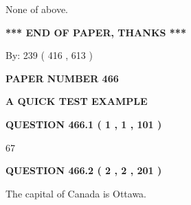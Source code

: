 \documentclass[12pt]{article}
\begin{document}
 
 None of above.
 
 
 
 
   
   
 \vspace{0.2in}
 
   
   
   
   
\vspace{1.0in} 
{\textbf{\large{ *** END OF PAPER, THANKS *** }}} 
   
   
\hspace{1.0in} By: 
 239 ( 416 ,  613 )
   
   
   
   
\newpage 
\setcounter{page}{ 
   466001 } 
   
   
   
   
 {\textbf{ \Large{ PAPER NUMBER  466  }}}
   
   
\vspace{0.2in}
   
   
   
   
   
   
 \vspace{0.2in}
{\LARGE {\textbf{ A QUICK TEST EXAMPLE}}}
   
   
  
\vspace{0.2in}
  
{\textbf{\Large{QUESTION
466.1 
 ( 1 , 1 , 101 )
}}}
  
  
 
 
\noindent{}

67
 
 
  
\vspace{0.2in}
  
{\textbf{\Large{QUESTION
466.2 
 ( 2 , 2 , 201 )
}}}
  
  
 
 
\noindent{}
 
 
The capital of Canada is Ottawa.
 
 
 
 
   
   
 \vspace{0.2in}
 
\end{document}
